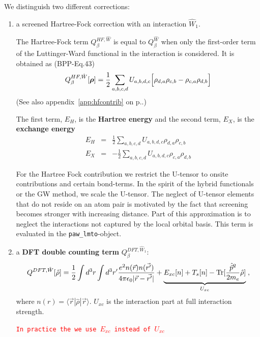 \documentclass[11pt,a4paper]{report}
\newcommand{\petertt}[1]{\textcolor{red}{\texttt{#1}}}
\begin{document}
We distinguish two different corrections:
\begin{enumerate}
\item a screened Hartree-Fock correction with an interaction
  $\hat{W}_1$. 

  The Hartree-Fock term $Q^{HF,\hat{W}}_{\beta}$ is equal to
  $Q^{\hat{W}}_\beta$ when only the first-order term of the
  Luttinger-Ward functional in the interaction is considered.  It is
  obtained as (BPP-Eq.43)
  \begin{eqnarray}
  Q_{\beta}^{HF,\hat{W}}[\bm{\rho}]
  =\frac{1}{2}\sum_{a,b,c,d}U_{a,b,d,c}
   \Bigl[\rho_{d,a}\rho_{c,b}-\rho_{c,a}\rho_{d,b}\Bigr]
  \end{eqnarray}
  (See also appendix~\ref{app:hfcontrib} on p.\pageref{app:hfcontrib}.)

  The first term, $E_H$, is the \textbf{Hartree energy} and the second term, $E_X$, is the \textbf{exchange
    energy}
  \begin{eqnarray}
    E_{H}& =&\frac{1}{2}\sum_{a,b,c,d}U_{a,b,d,c}\rho_{d,a}\rho_{c,b}
   \nonumber\\
    E_{X}& =&-\frac{1}{2}\sum_{a,b,c,d}U_{a,b,d,c}\rho_{c,a}\rho_{d,b}
  \end{eqnarray}

  For the Hartree Fock contribution we restrict the U-tensor to onsite
  contributions and certain bond-terms. In the spirit of the hybrid
  functionals or the GW method, we scale the U-tensor. The neglect of
  U-tensor elements that do not reside on an atom pair is motivated by
  the fact that screening becomes stronger with increasing
  distance. Part of this approximation is to neglect the interactions
  not captured by the local orbital basis. This term is evaluated in
  the \verb|paw_lmto|-object.
%
\item a \textbf{DFT double counting term} $Q^{DFT,\hat{W}_1}_\beta$:
  \begin{eqnarray}
  Q^{DFT,\hat{W}}[\hat{\rho}]=
  \frac{1}{2}\int d^3r\int d^3r'
  \frac{e^2n(\vec{r})n(\vec{r'})}{4\pi\epsilon_0|\vec{r}-\vec{r'}|}
  +\underbrace{E_{xc}[n]+T_s[n]
  -\mathrm{Tr}[\frac{\hat{\vec{p}}^2}{2m_e}\hat{\rho}]}_{U_{xc}}\;,
  \end{eqnarray}
 where $n(r)=\langle\vec{r}|\hat{\rho}|\vec{r}\rangle$.  $U_{xc}$ is
 the interaction part at full interaction strength.

  \petertt{In practice the we use $E_{xc}$ instead of $U_{xc}$}


\end{enumerate}
\end{document}
